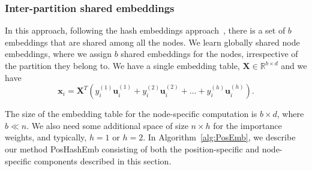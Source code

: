 \documentclass[conference]{IEEEtran}
\begin{document}
\subsubsection{Inter-partition shared embeddings}
In this approach, following the hash embeddings approach~\cite{svenstrup2017hash}, there is a set of $b$ embeddings that are shared among all the nodes. We learn globally shared node embeddings, where we assign $b$ shared embeddings for the nodes, irrespective of the partition they belong to. 
We have a single embedding table, $\mathbf{X} \in \mathbb{R}^{b \times d}$ and we have
\begin{equation}
\label{xi_inter}
    \mathbf{x}_i = \mathbf{X}^T(y^{(1)}_i \mathbf{u}_i^{(1)} + y^{(2)}_i \mathbf{u}_i^{(2)}+\dots + y^{(h)}_i \mathbf{u}_i^{(h)}).
\end{equation}


The size of the embedding table for the node-specific computation is $b \times d$, where $b \ll n$. We also need some additional space of size $n\times h$ for the importance weights, and typically, $h=1$ or $h=2$.
% 
In Algorithm~\ref{alg:PosEmb}, we describe our method PosHashEmb consisting of both the position-specific and node-specific components described in this section.




\end{document}
